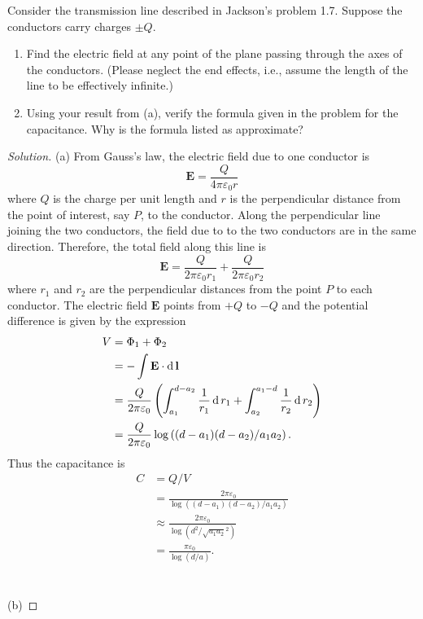 \begin{problem}
Consider the transmission line described in Jackson's problem
1.7. Suppose the conductors carry charges $\pm Q$.
 \begin{enumerate}[noitemsep,label=(\alph*)]
\item Find the electric field at any point of the plane passing
  through the axes of the conductors. (Please neglect the end
  effects, i.e., assume the length of the line to be effectively
  infinite.)
\item Using your result from (a), verify the formula given in the
  problem for the capacitance. Why is the formula listed as
  approximate?
\end{enumerate}
\end{problem}
\begin{proof}[Solution]
(a) From Gauss's law, the electric field due to one conductor is
\begin{equation}
\label{eq:electric-field-conductor}
\textbf{E}=\frac{Q}{4\pi\varepsilon_0 r}
\end{equation}
where $Q$ is the charge per unit length and $r$ is the
perpendicular distance from the point of interest, say $P$, to
the conductor. Along the perpendicular line joining the two
conductors, the field due to to the two conductors are in the
same direction. Therefore, the total field along this line is
\begin{equation}
\label{eq:total-electric-field}
\mathbf{E}=\frac{Q}{2\pi\varepsilon_0
  r_1}+\frac{Q}{2\pi\varepsilon_0 r_2}
\end{equation}
where $r_1$ and $r_2$ are the perpendicular distances from the
point $P$ to each conductor. The electric field $\mathbf{E}$
points from $+Q$ to $-Q$ and the potential difference is given by
the expression
\begin{align*}
V&=\Phi_1+\Phi_2\\
 &=-\int\mathbf{E}\cdot\operatorname{d}\mathbf{l}\\
 &=\frac{Q}{2\pi\varepsilon_0}
   \left(\int_{a_1}^{d-a_2}\frac{1}{r_1}\operatorname{d}
   r_1+\int_{a_2}^{a_1-d}\frac{1}{r_2}\operatorname{d} r_2\right)\\
 &=\frac{Q}{2\pi\varepsilon_0}\log\left((d-a_1)(d-a_2)/a_1a_2\right).
\end{align*}
Thus the capacitance is
\begin{align*}
C&=Q/V\\
 &=\frac{2\pi\varepsilon_0}{\log\left((d-a_1)(d-a_2)/a_1a_2\right)}\\
 &\approx
 \frac{2\pi\varepsilon_0}{\log\left(d^2/\sqrt{a_1a_2}^2\right)}\\
 &=\frac{\pi\varepsilon_0}{\log(d/a)}.
\end{align*}
\\\\
(b)
\end{proof}
\newpage

